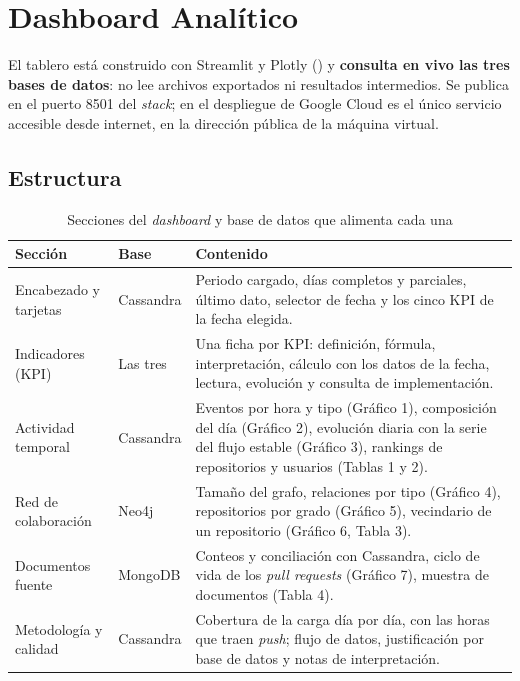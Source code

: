 \section{Dashboard Analítico}
\label{sec:dashboard}

El tablero está construido con Streamlit y Plotly () y \textbf{consulta en vivo las tres bases de datos}: no lee archivos exportados ni resultados intermedios. Se publica en el puerto 8501 del \textit{stack}; en el despliegue de Google Cloud es el único servicio accesible desde internet, en la dirección pública de la máquina virtual.

\subsection{Estructura}

\begin{table}[H]
\centering
\caption{Secciones del \textit{dashboard} y base de datos que alimenta cada una}
\label{tab:dashboard}
\vspace{0.2cm}
\small
\begin{tabular}{@{}p{4.3cm}p{2.3cm}p{8.0cm}@{}}
\toprule
\textbf{Sección} & \textbf{Base} & \textbf{Contenido} \\
\midrule
Encabezado y tarjetas     & Cassandra & Periodo cargado, días completos y parciales, último dato, selector de fecha y los cinco KPI de la fecha elegida. \\
Indicadores (KPI)         & Las tres  & Una ficha por KPI: definición, fórmula, interpretación, cálculo con los datos de la fecha, lectura, evolución y consulta de implementación. \\
Actividad temporal        & Cassandra & Eventos por hora y tipo (Gráfico 1), composición del día (Gráfico 2), evolución diaria con la serie del flujo estable (Gráfico 3), rankings de repositorios y usuarios (Tablas 1 y 2). \\
Red de colaboración       & Neo4j     & Tamaño del grafo, relaciones por tipo (Gráfico 4), repositorios por grado (Gráfico 5), vecindario de un repositorio (Gráfico 6, Tabla 3). \\
Documentos fuente         & MongoDB   & Conteos y conciliación con Cassandra, ciclo de vida de los \textit{pull requests} (Gráfico 7), muestra de documentos (Tabla 4). \\
Metodología y calidad     & Cassandra & Cobertura de la carga día por día, con las horas que traen \textit{push}; flujo de datos, justificación por base de datos y notas de interpretación. \\
\bottomrule
\end{tabular}
\end{table}

